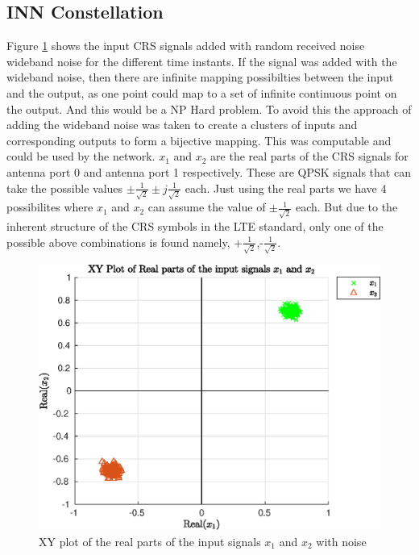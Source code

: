 \subsection{INN Constellation}\label{ssec:INNConstellation}

Figure \ref{fig:INNxn} shows the input CRS signals added with random received noise wideband noise for the different time instants. If the signal was added with the wideband noise, then there are infinite mapping possibilties between the input and the output, as one point could map to a set of infinite continuous point on the output. And this would be a NP Hard problem. To avoid this the approach of adding the wideband noise was taken to create a clusters of inputs and corresponding outputs to form a bijective mapping. This was computable and could be used by the network. $x_1$ and $x_2$ are the real parts of the CRS signals for antenna port 0 and antenna port 1 respectively. These are QPSK signals that can take the possible values  $\pm \frac{1}{\sqrt{2}} \pm j \frac{1}{\sqrt{2}}$ each. Just using the real parts we have 4 possibilites where $x_1$ and $x_2$ can assume the value of $\pm \frac{1}{\sqrt{2}}$ each. But due to the inherent structure of the CRS symbols in the LTE standard, only one of the possible above combinations is found namely, +$\frac{1}{\sqrt{2}}$,-$\frac{1}{\sqrt{2}}$.

\begin{figure}[!htb]
    \centering
    \includegraphics[width=\linewidth]{images/INNxn.eps}
    \caption{XY plot of the real parts of the input signals $x_1$ and $x_2$ with noise}
    \label{fig:INNxn}
\end{figure}

